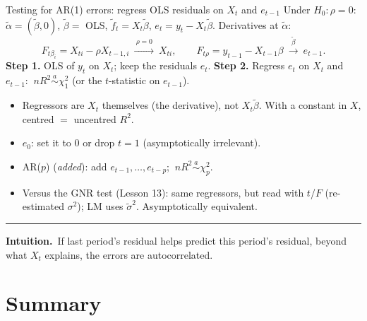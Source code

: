 \documentclass[aspectratio=169,11pt,t]{beamer}
\newcommand{\asim}{\overset{a}{\sim}}
\newcommand{\intuition}[1]{\par\vfill
  {\color{intu}\rule{\linewidth}{0.4pt}}\par\vspace{1pt}
  {\small\color{intu}\textbf{Intuition.}\ #1}\par\vspace{2pt}}
\begin{document}
\begin{frame}{Testing for AR(1) errors: regress OLS residuals on $X_{t}$ and $e_{t-1}$}
Under $H_{0}\colon\rho=0$: $\tilde\alpha=(\tilde\beta,0)$, $\tilde\beta=$ OLS, $\tilde f_{t}=X_{t}\tilde\beta$, $e_{t}=y_{t}-X_{t}\tilde\beta$. Derivatives at $\tilde\alpha$:
\[ F_{t\beta_{i}}=X_{ti}-\rho X_{t-1,i}\ \xrightarrow{\ \rho=0\ }\ X_{ti},\qquad
   F_{t\rho}=y_{t-1}-X_{t-1}\beta\ \xrightarrow{\ \tilde\beta\ }\ e_{t-1}. \]
\textbf{Step 1.} OLS of $y_{t}$ on $X_{t}$; keep the residuals $e_{t}$.\quad
\textbf{Step 2.} Regress $e_{t}$ on $X_{t}$ and $e_{t-1}$: $\ nR^{2}\asim\chi^{2}_{1}$ (or the $t$-statistic on $e_{t-1}$).
\begin{itemize}\footnotesize
 \item Regressors are $X_{t}$ themselves (the derivative), not $X_{t}\tilde\beta$. With a constant in $X$, centred $=$ uncentred $R^{2}$.
 \item $e_{0}$: set it to $0$ or drop $t=1$ (asymptotically irrelevant).
 \item AR($p$) (\emph{added}): add $e_{t-1},\dots,e_{t-p}$; $\ nR^{2}\asim\chi^{2}_{p}$.
 \item Versus the GNR test (Lesson 13): same regressors, but read with $t$/$F$ (re-estimated $\sigma^{2}$); LM uses $\tilde\sigma^{2}$. Asymptotically equivalent.
\end{itemize}
\intuition{If last period's residual helps predict this period's residual, beyond what $X_{t}$ explains, the errors are autocorrelated.}
\end{frame}

\section{Summary}
\end{document}
